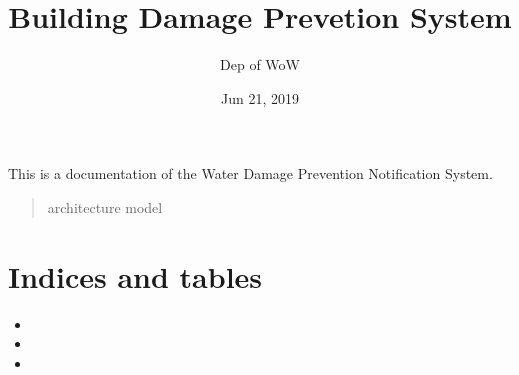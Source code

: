 \documentclass[letterpaper,10pt,english]{sphinxmanual}
\title{Building Damage Prevetion System}
\date{Jun 21, 2019}
\author{Dep of WoW}
\begin{document}
\pagestyle{empty}
\sphinxmaketitle
\pagestyle{plain}
\sphinxtableofcontents
\pagestyle{normal}
\label{\detokenize{index::doc}}


This is a documentation of the Water Damage Prevention Notification System.
\begin{quote}

architecture
model
\end{quote}


\chapter{Indices and tables}
\label{\detokenize{index:indices-and-tables}}\begin{itemize}
\item {} 

\item {} 

\item {} 

\end{itemize}



\renewcommand{\indexname}{Index}
\printindex
\end{document}
